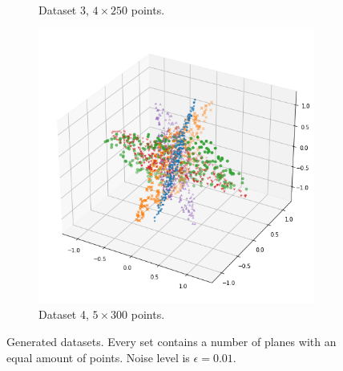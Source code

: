 \begin{figure}
\begin{subfigure}{.3\textwidth}
        \caption{Dataset 3, $4 \times 250$ points.}
    \end{subfigure}%
    \hspace{1em}
    \begin{subfigure}{.3\textwidth}
        \centering
        \includegraphics[width=\textwidth]{pics/ds4.png}
        \caption{Dataset 4, $5 \times 300$ points.}
    \end{subfigure}
    \captionsetup{width=.9\linewidth}
    \caption{Generated datasets. Every set contains a number of planes with an equal amount of points. Noise level is $\epsilon = 0.01$.} \label{fig:data}
\end{figure}

